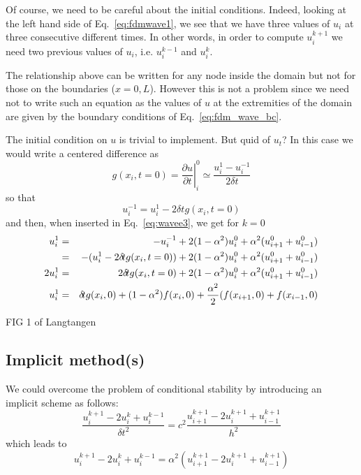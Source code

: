 Of course, we need to be careful about the initial conditions. Indeed, looking 
at the left hand side of Eq.~\eqref{eq:fdmwave1}, we see that we have three values of $u_i$
at three consecutive different times.
In other words, in order to compute $u_i^{k+1}$ we need two previous values 
of $u_i$, i.e. $u_i^{k-1}$ and $u_{i}^k$. 

The relationship above can be written for any node inside the domain but not for those on the 
boundaries ($x=0,L$). However this is not a problem since we need not to write such an equation
as the values of $u$ at the extremities of the domain are given by the boundary conditions of 
Eq.~\ref{eq:fdm_wave_bc}.

The initial condition on $u$ is trivial to implement. But quid of $u_t$? In this case we would 
write a centered difference as 
\[
g(x_i,t=0)=\left. \frac{\partial u}{\partial t} \right|_{i}^0 \simeq \frac{u_i^1-u_i^{-1}}{2 \delta \! t} 
\]
so that 
\[
u_i^{-1} = u_i^1 - 2 \delta \! t g(x_i,t=0)
\]
and then, when inserted in Eq.~\eqref{eq:wavee3}, we get for $k=0$
\begin{eqnarray}
u_i^{1} 
&=& - u_i^{-1} +2(1-\alpha^2) u_{i}^0 + \alpha^2 (u_{i+1}^0 +u_{i-1}^0)  \nonumber\\
&=& - (u_i^1 - 2 \delta \! t g(x_i,t=0))  +2(1-\alpha^2) u_{i}^0 + \alpha^2 (u_{i+1}^0 +u_{i-1}^0)  \nonumber\\
2 u_i^1 &=& 2 \delta \! t g(x_i,t=0)  +2(1-\alpha^2) u_{i}^0 + \alpha^2 (u_{i+1}^0 +u_{i-1}^0)  \nonumber\\
u_i^1 &=&  \delta \! t g(x_i,0)  + (1-\alpha^2) f(x_{i},0) + \frac{\alpha^2}{2} (f(x_{i+1},0) + f(x_{i-1},0) \nonumber\\
\end{eqnarray}



FIG 1 of Langtangen

\subsection{Implicit method(s)}

We could overcome the problem of conditional stability by 
introducing an implicit scheme as follows:
\[
\frac{ u_i^{k+1} -2u_i^{k} +u_i^{k-1}  }{\delta\! t^2} = 
c^2
\frac{ u_{i+1}^{k+1} -2u_{i}^{k+1} +u_{i-1}^{k+1}  }{h^2} 
\]
which leads to 
\[
u_i^{k+1} -2u_i^{k} +u_i^{k-1}  = 
\alpha ^2 ( u_{i+1}^{k+1} -2u_{i}^{k+1} +u_{i-1}^{k+1} )
\]




